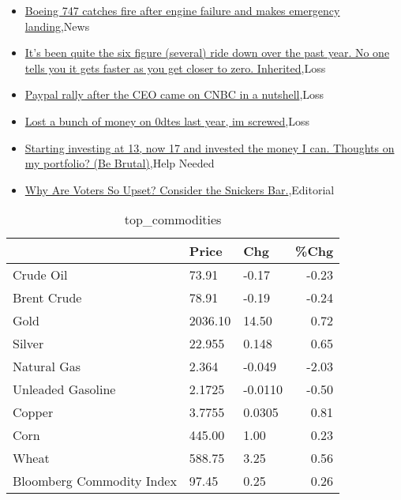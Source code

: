 \documentclass{article}%
\begin{document}
%
\begin{itemize}%
\item%
\href{https://reddit.com/r/wallstreetbets/comments/19ag8p9/boeing\_747\_catches\_fire\_after\_engine\_failure\_and/}{Boeing 747 catches fire after engine failure and makes emergency landing},News%
\item%
\href{https://reddit.com/r/wallstreetbets/comments/19ag3y9/its\_been\_quite\_the\_six\_figure\_several\_ride\_down/}{It's been quite the six figure (several) ride down over the past year. No one tells you it gets faster as you get closer to zero. Inherited},Loss%
\item%
\href{https://reddit.com/r/wallstreetbets/comments/19afi8z/paypal\_rally\_after\_the\_ceo\_came\_on\_cnbc\_in\_a/}{Paypal rally after the CEO came on CNBC in a nutshell},Loss%
\item%
\href{https://reddit.com/r/wallstreetbets/comments/19ac140/lost\_a\_bunch\_of\_money\_on\_0dtes\_last\_year\_im/}{Lost a bunch of money on 0dtes last year, im screwed},Loss%
\item%
\href{https://reddit.com/r/StockMarket/comments/19a7n7u/starting\_investing\_at\_13\_now\_17\_and\_invested\_the/}{Starting investing at 13, now 17 and invested the money I can. Thoughts on my portfolio? (Be Brutal)},Help Needed%
\item%
\href{https://reddit.com/r/Economics/comments/19a7nsk/why\_are\_voters\_so\_upset\_consider\_the\_snickers\_bar/}{Why Are Voters So Upset? Consider the Snickers Bar.},Editorial%
\end{itemize}%


\begin{table}[htbp]%
\caption{top\_commodities}%
\centering%
\begin{adjustbox}{width=1\textwidth}%
\begin{tabular}{lllr}
\toprule
                          &   Price &     Chg &  \%Chg \\
\midrule
               Crude Oil  &   73.91 &   -0.17 & -0.23 \\
             Brent Crude  &   78.91 &   -0.19 & -0.24 \\
                    Gold  & 2036.10 &   14.50 &  0.72 \\
                  Silver  &  22.955 &   0.148 &  0.65 \\
             Natural Gas  &   2.364 &  -0.049 & -2.03 \\
       Unleaded Gasoline  &  2.1725 & -0.0110 & -0.50 \\
                  Copper  &  3.7755 &  0.0305 &  0.81 \\
                    Corn  &  445.00 &    1.00 &  0.23 \\
                   Wheat  &  588.75 &    3.25 &  0.56 \\
Bloomberg Commodity Index &   97.45 &    0.25 &  0.26 \\
\bottomrule
\end{tabular}
%
\end{adjustbox}%
\end{table}
\end{document}
